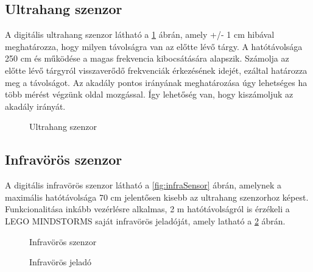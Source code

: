 \subsection{Ultrahang szenzor}
A digitális ultrahang szenzor látható a \ref{fig:ultrasonicSensor} ábrán, amely +/- 1 cm hibával meghatározza, hogy milyen távolságra van az előtte lévő tárgy. A hatótávolsága 250 cm és működése a magas frekvencia kibocsátására  alapszik. Számolja az előtte lévő tárgyról visszaverődő frekvenciák érkezésének idejét, ezáltal határozza meg a távolságot. Az akadály pontos irányának meghatározása úgy lehetséges ha több mérést végzünk oldal mozgással. Így lehetőség van, hogy kiszámoljuk az akadály irányát.

\begin{figure}[!htb]
	\label{fig:ultrasonicSensor}
	\centering
	\caption{Ultrahang szenzor}
\end{figure}

\subsection{Infravörös szenzor}
A digitális infravörös szenzor látható a \ref{fig:infraSensor} ábrán, amelynek a maximális hatótávolsága 70 cm jelentősen kisebb az ultrahang szenzorhoz képest. Funkcionalitása inkább vezérlésre alkalmas, 2 m hatótávolságról is érzékeli a LEGO MINDSTORMS saját infravörös jeladóját, amely latható a \ref{fig:beacon} ábrán.

\begin{figure}[!htb]
	\centering
	\label{fig:infraSensor}
	\caption{Infravörös szenzor}
	\endminipage
	\label{fig:beacon}
	\caption{Infravörös jeladó}
	\endminipage
\end{figure}
